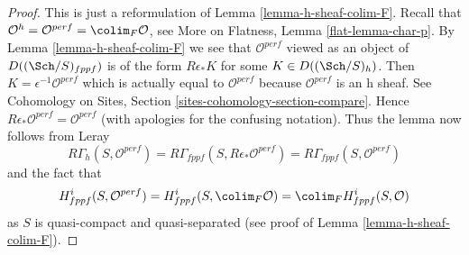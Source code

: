 \begin{proof}
This is just a reformulation of Lemma \ref{lemma-h-sheaf-colim-F}.
Recall that
$\mathcal{O}^h = \mathcal{O}^{perf} = \colim_F \mathcal{O}$, see
More on Flatness, Lemma \ref{flat-lemma-char-p}.
By Lemma \ref{lemma-h-sheaf-colim-F} we see that
$\mathcal{O}^{perf}$ viewed as an object of $D((\Sch/S)_{fppf})$
is of the form $R\epsilon_*K$ for some $K \in D((\Sch/S)_h)$.
Then $K = \epsilon^{-1}\mathcal{O}^{perf}$ which is actually
equal to $\mathcal{O}^{perf}$ because $\mathcal{O}^{perf}$ is an h sheaf. See
Cohomology on Sites, Section \ref{sites-cohomology-section-compare}.
Hence $R\epsilon_*\mathcal{O}^{perf} = \mathcal{O}^{perf}$
(with apologies for the confusing notation).
Thus the lemma now follows from Leray
$$
R\Gamma_h(S, \mathcal{O}^{perf}) =
R\Gamma_{fppf}(S, R\epsilon_*\mathcal{O}^{perf}) =
R\Gamma_{fppf}(S, \mathcal{O}^{perf})
$$
and the fact that
$$
H^i_{fppf}(S, \mathcal{O}^{perf}) =
H^i_{fppf}(S, \colim_F \mathcal{O}) =
\colim_F H^i_{fppf}(S, \mathcal{O})
$$
as $S$ is quasi-compact and quasi-separated
(see proof of Lemma \ref{lemma-h-sheaf-colim-F}).
\end{proof}


















